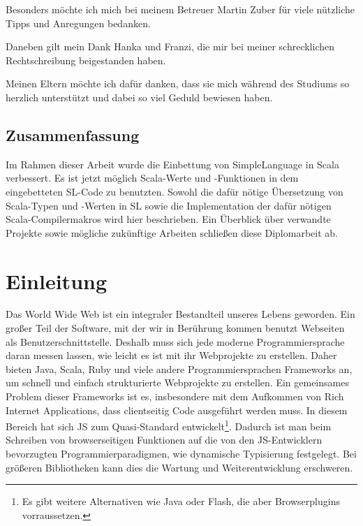 \documentclass[12pt,bibtotoc]{scrreprt}
\begin{document}
Besonders möchte ich mich bei meinem Betreuer Martin Zuber für viele nützliche Tipps und Anregungen bedanken.

Daneben gilt mein Dank Hanka und Franzi, die mir bei meiner schrecklichen Rechtschreibung beigestanden haben.

Meinen Eltern möchte ich dafür danken, dass sie mich während des Studiums so herzlich unterstützt und dabei so viel Geduld bewiesen haben.

\newpage


\lstset{basicstyle=\ttfamily\small, numbers=left, numberstyle=\tiny}

\section*{Zusammenfassung}
\setcounter{page}{1}

Im Rahmen dieser Arbeit wurde die Einbettung von SimpleLanguage in Scala verbessert. Es ist jetzt möglich Scala-Werte und -Funktionen in dem eingebetteten SL-Code zu benutzten. Sowohl die dafür nötige Übersetzung von Scala-Typen und -Werten in SL sowie die Implementation der dafür nötigen Scala-Compilermakros wird hier beschrieben. Ein Überblick über verwandte Projekte sowie mögliche zukünftige Arbeiten schließen diese Diplomarbeit ab.

\chapter{Einleitung}


Das World Wide Web ist ein integraler Bestandteil unseres Lebens geworden. Ein großer Teil der Software, mit der wir in Berührung kommen benutzt Webseiten als Benutzerschnittstelle. Deshalb muss sich jede moderne Programmiersprache daran messen lassen, wie leicht es ist mit ihr Webprojekte zu erstellen. Daher bieten Java, Scala, Ruby und viele andere Programmiersprachen Frameworks an, um schnell und einfach strukturierte Webprojekte zu erstellen. Ein gemeinsames Problem dieser Frameworks ist es, insbesondere mit dem Aufkommen von Rich Internet Applications, dass clientseitig Code ausgeführt werden muss. In diesem Bereich hat sich \ac{JS} zum Quasi-Standard entwickelt\footnote{Es gibt weitere Alternativen wie Java oder Flash, die aber Browserplugins vorraussetzen.}. Dadurch ist man beim Schreiben von browserseitigen Funktionen auf die von den JS-Entwicklern bevorzugten Programmierparadigmen, wie dynamische Typisierung festgelegt. Bei größeren Bibliotheken kann dies die Wartung und Weiterentwicklung erschweren.
\end{document}
